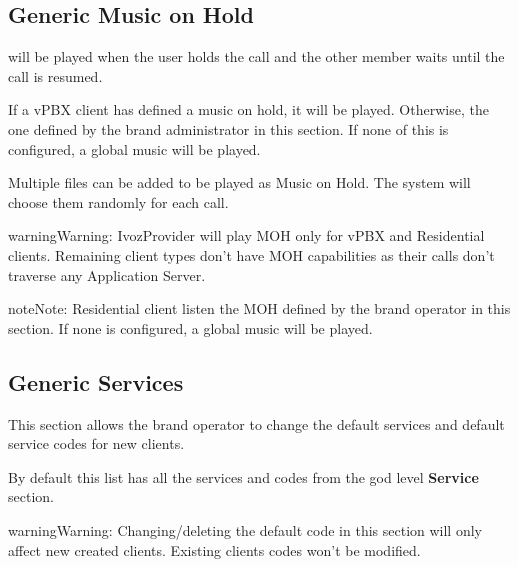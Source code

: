 \documentclass[letterpaper,10pt,english]{sphinxmanual}
\begin{document}
\subsection{Generic Music on Hold}
\label{administration_portal/brand/settings/generic_music_on_hold:generic-music-on-hold}\label{administration_portal/brand/settings/generic_music_on_hold::doc}
{\hyperref[administration_portal/client/vpbx/multimedia/music_on_hold:music\string-on\string-hold]{}} will be played when the user holds the call and the other
member waits until the call is resumed.

If a vPBX client has defined a music on hold, it will be played. Otherwise, the
one defined by the brand administrator in this section. If none of this is configured,
a global music will be played.

Multiple files can be added to be played as Music on Hold. The system will choose them randomly for each call.

\begin{notice}{warning}{Warning:}
IvozProvider will play MOH only for vPBX and Residential clients. Remaining client
types don't have MOH capabilities as their calls don't traverse any Application Server.
\end{notice}

\begin{notice}{note}{Note:}
Residential client listen the MOH defined by the brand operator in this section. If none is configured,
a global music will be played.
\end{notice}


\subsection{Generic Services}
\label{administration_portal/brand/settings/generic_services:generic-services}\label{administration_portal/brand/settings/generic_services::doc}\label{administration_portal/brand/settings/generic_services:brand-services}
This section allows the brand operator to change the default services and default service codes for new clients.

By default this list has all the services and codes from the god level \textbf{Service} section.

\begin{notice}{warning}{Warning:}
Changing/deleting the default code in this section will only affect new created clients. Existing clients codes won't
be modified.
\end{notice}
\end{document}
